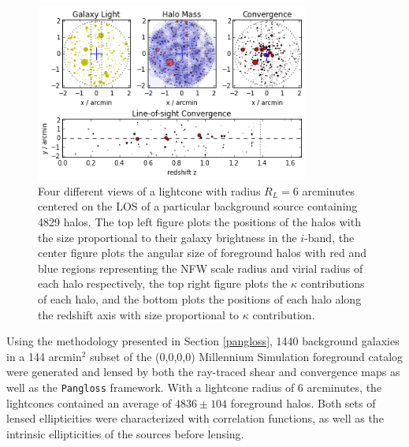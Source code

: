 \documentclass[%
 reprint,
 amsmath,amssymb,
 aps,nofootinbib
]{revtex4-1}
\begin{document}
\begin{figure}
    \centering
    \includegraphics[width=0.8\textwidth]{figs-swe/thesis/lightcone_plots.png}
    \captionsetup{justification=raggedright,singlelinecheck=false}
    \caption{Four different views of a lightcone with radius $R_L=6$ arcminutes centered on the LOS of a particular background source containing 4829 halos.  The top left figure plots the positions of the halos with the size proportional to their galaxy brightness in the $i$-band, the center figure plots the angular size of foreground halos with red and blue regions representing the NFW scale radius and virial radius of each halo respectively, the top right figure plots the $\kappa$ contributions of each halo, and the bottom plots the positions of each halo along the redshift axis with size proportional to $\kappa$ contribution.}
    \label{fig:lightcone}
\end{figure}

Using the methodology presented in Section \ref{pangloss}, 1440 background galaxies in a 144 arcmin$^2$ subset of the (0,0,0,0) Millennium Simulation foreground catalog were generated and lensed by both the ray-traced shear and convergence maps as well as the \texttt{Pangloss} framework. With a lightcone radius of 6 arcminutes, the lightcones contained an average of ${4836\pm104}$ foreground halos. Both sets of lensed ellipticities were characterized with correlation functions, as well as the intrinsic ellipticities of the sources before lensing.
\end{document}

